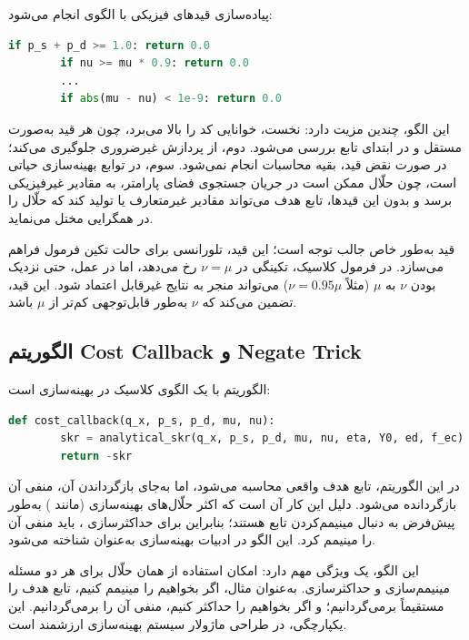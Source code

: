 پیاده‌سازی قیدهای فیزیکی با الگوی  انجام می‌شود:

\begin{LTR}
	\begin{lstlisting}[language=Python]
		if p_s + p_d >= 1.0: return 0.0
		if nu >= mu * 0.9: return 0.0
		...
		if abs(mu - nu) < 1e-9: return 0.0
	\end{lstlisting}
\end{LTR}

این الگو، چندین مزیت دارد: نخست، خوانایی کد را بالا می‌برد، چون هر قید به‌صورت مستقل و در ابتدای تابع بررسی می‌شود. دوم، از پردازش غیرضروری جلوگیری می‌کند؛ در صورت نقض قید، بقیه محاسبات انجام نمی‌شود. سوم، در توابع بهینه‌سازی حیاتی است، چون حلّال ممکن است در جریان جستجوی فضای پارامتر، به مقادیر غیرفیزیکی برسد و بدون این قیدها، تابع هدف می‌تواند مقادیر غیرمتعارف یا  تولید کند که حلّال را در همگرایی مختل می‌نماید.

قید \lr{$\nu \geq 0.9 \mu$} به‌طور خاص جالب توجه است؛ این قید، تلورانسی برای حالت تکین فرمول  فراهم می‌سازد. در فرمول کلاسیک، تکینگی در $\nu = \mu$ رخ می‌دهد، اما در عمل، حتی نزدیک بودن $\nu$ به $\mu$ (مثلاً $\nu = 0.95 \mu$) می‌تواند منجر به نتایج غیرقابل اعتماد شود. این قید، تضمین می‌کند که $\nu$ به‌طور قابل‌توجهی کم‌تر از $\mu$ باشد.

\subsection{الگوریتم Cost Callback و Negate Trick}

الگوریتم  با  یک الگوی کلاسیک در بهینه‌سازی است:

\begin{LTR}
	\begin{lstlisting}[language=Python]
		def cost_callback(q_x, p_s, p_d, mu, nu):
		skr = analytical_skr(q_x, p_s, p_d, mu, nu, eta, Y0, ed, f_ec)
		return -skr
	\end{lstlisting}
\end{LTR}

در این الگوریتم، تابع هدف واقعی  محاسبه می‌شود، اما به‌جای بازگرداندن آن، منفی آن بازگردانده می‌شود. دلیل این کار آن است که اکثر حلّال‌های بهینه‌سازی (مانند ) به‌طور پیش‌فرض به دنبال مینیمم‌کردن تابع هستند؛ بنابراین برای حداکثرسازی ، باید منفی آن را مینیمم کرد. این الگو در ادبیات بهینه‌سازی به‌عنوان  شناخته می‌شود.

این الگو، یک ویژگی مهم دارد: امکان استفاده از همان حلّال برای هر دو مسئله مینیمم‌سازی و حداکثرسازی. به‌عنوان مثال، اگر بخواهیم  را مینیمم کنیم، تابع هدف  را مستقیماً برمی‌گردانیم؛ و اگر بخواهیم  را حداکثر کنیم، منفی آن را برمی‌گردانیم. این یکپارچگی، در طراحی ماژولار سیستم بهینه‌سازی ارزشمند است.

